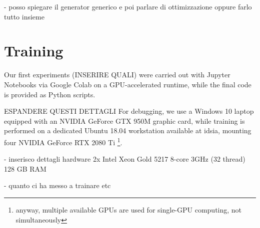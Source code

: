- posso spiegare il generator generico e poi parlare di ottimizzazione oppure farlo tutto insieme


\section{Training}
\label{sec:implementation-training}

Our first experiments (INSERIRE QUALI) were carried out with Jupyter Notebooks via Google Colab on a GPU-accelerated runtime, while the final code is provided as Python scripts. 

ESPANDERE QUESTI DETTAGLI
For debugging, we use a Windows 10 laptop equipped with an NVIDIA GeForce GTX 950M graphic card, while training is performed on a dedicated Ubuntu 18.04 workstation available at \gls{idsia}, mounting four NVIDIA GeForce RTX 2080 Ti \footnote{anyway, multiple available GPUs are used for single-GPU computing, not simultaneously}.

- inserisco dettagli hardware
    2x Intel Xeon Gold 5217 8-core 3GHz (32 thread)
    128 GB RAM
    
- quanto ci ha messo a trainare etc



